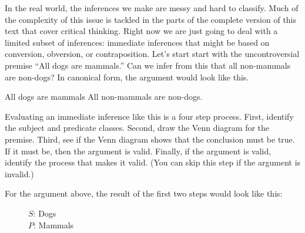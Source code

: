 In the real world, the inferences we make are messy and hard to classify. Much of the complexity of this issue is tackled in the parts of the complete version of this text that cover critical thinking. \label{ver_var}  Right now we are just going to deal with a limited subset of inferences: immediate inferences that might be based on conversion, obversion, or contraposition. Let's start start with the uncontroversial premise ``All dogs are mammals.'' Can we infer from this that all non-mammals are non-dogs? In canonical form, the argument would look like this.


\begin{earg*}
\item All dogs are mammals
\itemc[.3] All non-mammals are non-dogs.
\end{earg*}

Evaluating an immediate inference like this is a four step process. First, identify the subject and predicate classes. Second, draw the Venn diagram for the premise. Third, see if the Venn diagram shows that the conclusion must be true. If it must be, then the argument is valid. Finally, if the argument is valid, identify the process that makes it valid. (You can skip this step if the argument is invalid.)

For the argument above, the result of the first two steps would look like this:

\begin{figure}[H]
\begin{center}
\end{center}
\captionsetup{singlelinecheck=on}
\caption*{$S$: Dogs \\ $P$: Mammals}
\end{figure}


